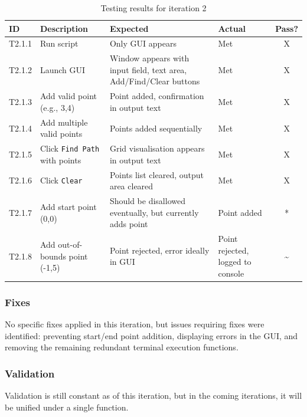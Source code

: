 \begin{table}[htbp]
	\centering
	\begin{tabularx}{\textwidth}{|l|X|p{5.5cm}|p{2.8cm}|c|}
		\hline
		\textbf{ID} & \textbf{Description} & \textbf{Expected} & \textbf{Actual} & \textbf{Pass?} \\
		\hline
		T2.1.1 & Run script & Only GUI appears & Met & X \\
		\hline
		T2.1.2 & Launch GUI & Window appears with input field, text area, Add/Find/Clear buttons & Met & X \\
		\hline
		T2.1.3 & Add valid point (e.g., 3,4) & Point added, confirmation in output text & Met & X \\
		\hline
		T2.1.4 & Add multiple valid points & Points added sequentially & Met & X \\
		\hline
		T2.1.5 & Click \verb|Find Path| with points & Grid visualisation appears in output text & Met & X \\
		\hline
		T2.1.6 & Click \verb|Clear| & Points list cleared, output area cleared & Met & X \\
		\hline
		T2.1.7 & Add start point (0,0) & Should be disallowed eventually, but currently adds point & Point added & * \\
		\hline
		T2.1.8 & Add out-of-bounds point (-1,5) & Point rejected, error ideally in GUI & Point rejected, logged to console &\~{} \\
		\hline
	\end{tabularx}
	\caption{Testing results for iteration 2}
\end{table}


\subsubsection{Fixes}
No specific fixes applied in this iteration, but issues requiring fixes were identified: preventing start/end point addition, displaying errors in the GUI, and removing the remaining redundant terminal execution functions.

\subsubsection{Validation}

Validation is still constant as of this iteration, but in the coming iterations, it will be unified under a single function.

\newpage %

